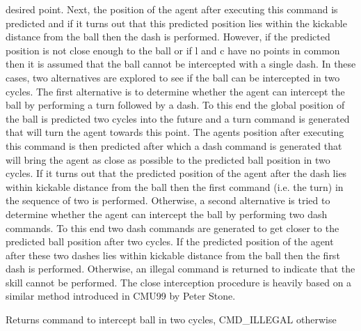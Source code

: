 desired point. Next, the position of the agent after executing this command is predicted and if it turns out that this predicted position lies within the kickable distance from the ball then the dash is performed. However, if the predicted position is not close enough to the ball or if l and c have no points in common then it is assumed that the ball cannot be intercepted with a single dash. In these cases, two alternatives are explored to see if the ball can be intercepted in two cycles. The first alternative is to determine whether the agent can intercept the ball by performing a turn followed by a dash. To this end the global position of the ball is predicted two cycles into the future and a turn command is generated that will turn the agent towards this point. The agent\textquotesingle{}s position after executing this command is then predicted after which a dash command is generated that will bring the agent as close as possible to the predicted ball position in two cycles. If it turns out that the predicted position of the agent after the dash lies within kickable distance from the ball then the first command (i.\+e. the turn) in the sequence of two is performed. Otherwise, a second alternative is tried to determine whether the agent can intercept the ball by performing two dash commands. To this end two dash commands are generated to get closer to the predicted ball position after two cycles. If the predicted position of the agent after these two dashes lies within kickable distance from the ball then the first dash is performed. Otherwise, an illegal command is returned to indicate that the skill cannot be performed. The close interception procedure is heavily based on a similar method introduced in C\+MU\textquotesingle{}99 by Peter Stone. \begin{DoxyReturn}{Returns}
command to intercept ball in two cycles, C\+M\+D\+\_\+\+I\+L\+L\+E\+G\+AL otherwise 
\end{DoxyReturn}
